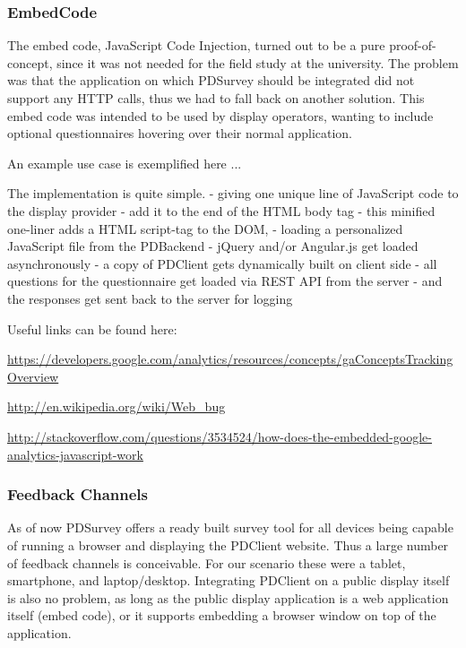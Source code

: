 	\subsubsection{EmbedCode}

		The embed code, JavaScript Code Injection, turned out to be a pure proof-of-concept, since it was not needed for the field study at the university. The problem was that the application on which PDSurvey should be integrated did not support any HTTP calls, thus we had to fall back on another solution. This embed code was intended to be used by display operators, wanting to include optional questionnaires hovering over their normal application. 



		An example use case is exemplified here ...



		The implementation is quite simple. 
		 - giving one unique line of JavaScript code to the display provider
		 - add it to the end of the HTML body tag
		 - this minified one-liner adds a HTML script-tag to the DOM,
		 - loading a personalized JavaScript file from the PDBackend
		 - jQuery and/or Angular.js get loaded asynchronously
		 - a copy of PDClient gets dynamically built on client side
		 - all questions for the questionnaire get loaded via REST API from the server
		 - and the responses get sent back to the server for logging

		Useful links can be found here:

		\url{https://developers.google.com/analytics/resources/concepts/gaConceptsTrackingOverview}

		\url{http://en.wikipedia.org/wiki/Web_bug}

		\url{http://stackoverflow.com/questions/3534524/how-does-the-embedded-google-analytics-javascript-work}

	\subsubsection{Feedback Channels}

	As of now PDSurvey offers a ready built survey tool for all devices being capable of running a browser and displaying the PDClient website. Thus a large number of feedback channels is conceivable. For our scenario these were a tablet, smartphone, and laptop/desktop. Integrating PDClient on a public display itself is also no problem, as long as the public display application is a web application itself (embed code), or it supports embedding a browser window on top of the application. 

